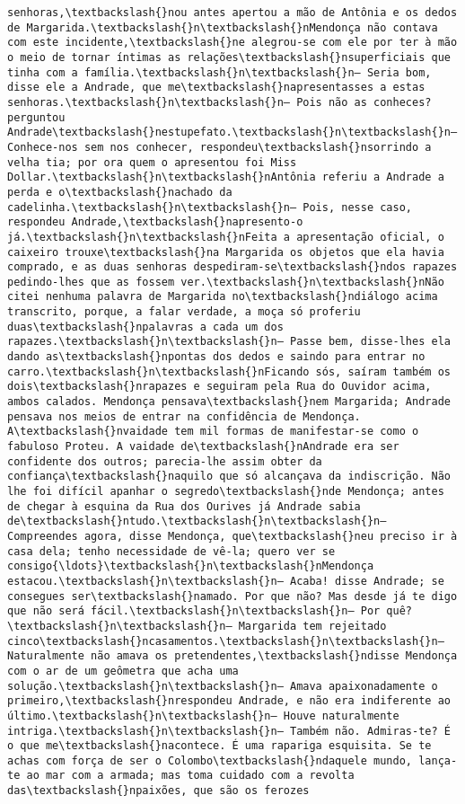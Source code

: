 \begin{Verbatim}[commandchars=\\\{\}]
senhoras,\textbackslash{}nou antes apertou a mão de Antônia e os dedos de Margarida.\textbackslash{}n\textbackslash{}nMendonça não contava com este incidente,\textbackslash{}ne alegrou-se com ele por ter à mão o meio de tornar íntimas as relações\textbackslash{}nsuperficiais que tinha com a família.\textbackslash{}n\textbackslash{}n— Seria bom, disse ele a Andrade, que me\textbackslash{}napresentasses a estas senhoras.\textbackslash{}n\textbackslash{}n— Pois não as conheces? perguntou Andrade\textbackslash{}nestupefato.\textbackslash{}n\textbackslash{}n— Conhece-nos sem nos conhecer, respondeu\textbackslash{}nsorrindo a velha tia; por ora quem o apresentou foi Miss Dollar.\textbackslash{}n\textbackslash{}nAntônia referiu a Andrade a perda e o\textbackslash{}nachado da cadelinha.\textbackslash{}n\textbackslash{}n— Pois, nesse caso, respondeu Andrade,\textbackslash{}napresento-o já.\textbackslash{}n\textbackslash{}nFeita a apresentação oficial, o caixeiro trouxe\textbackslash{}na Margarida os objetos que ela havia comprado, e as duas senhoras despediram-se\textbackslash{}ndos rapazes pedindo-lhes que as fossem ver.\textbackslash{}n\textbackslash{}nNão citei nenhuma palavra de Margarida no\textbackslash{}ndiálogo acima transcrito, porque, a falar verdade, a moça só proferiu duas\textbackslash{}npalavras a cada um dos rapazes.\textbackslash{}n\textbackslash{}n— Passe bem, disse-lhes ela dando as\textbackslash{}npontas dos dedos e saindo para entrar no carro.\textbackslash{}n\textbackslash{}nFicando sós, saíram também os dois\textbackslash{}nrapazes e seguiram pela Rua do Ouvidor acima, ambos calados. Mendonça pensava\textbackslash{}nem Margarida; Andrade pensava nos meios de entrar na confidência de Mendonça. A\textbackslash{}nvaidade tem mil formas de manifestar-se como o fabuloso Proteu. A vaidade de\textbackslash{}nAndrade era ser confidente dos outros; parecia-lhe assim obter da confiança\textbackslash{}naquilo que só alcançava da indiscrição. Não lhe foi difícil apanhar o segredo\textbackslash{}nde Mendonça; antes de chegar à esquina da Rua dos Ourives já Andrade sabia de\textbackslash{}ntudo.\textbackslash{}n\textbackslash{}n— Compreendes agora, disse Mendonça, que\textbackslash{}neu preciso ir à casa dela; tenho necessidade de vê-la; quero ver se consigo{\ldots}\textbackslash{}n\textbackslash{}nMendonça estacou.\textbackslash{}n\textbackslash{}n— Acaba! disse Andrade; se consegues ser\textbackslash{}namado. Por que não? Mas desde já te digo que não será fácil.\textbackslash{}n\textbackslash{}n— Por quê?\textbackslash{}n\textbackslash{}n— Margarida tem rejeitado cinco\textbackslash{}ncasamentos.\textbackslash{}n\textbackslash{}n— Naturalmente não amava os pretendentes,\textbackslash{}ndisse Mendonça com o ar de um geômetra que acha uma solução.\textbackslash{}n\textbackslash{}n— Amava apaixonadamente o primeiro,\textbackslash{}nrespondeu Andrade, e não era indiferente ao último.\textbackslash{}n\textbackslash{}n— Houve naturalmente intriga.\textbackslash{}n\textbackslash{}n— Também não. Admiras-te? É o que me\textbackslash{}nacontece. É uma rapariga esquisita. Se te achas com força de ser o Colombo\textbackslash{}ndaquele mundo, lança-te ao mar com a armada; mas toma cuidado com a revolta das\textbackslash{}npaixões, que são os ferozes 
\end{Verbatim}
